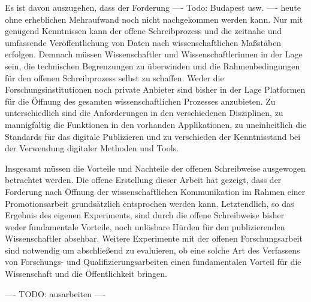 Es ist davon auszugehen, dass der Forderung ---- Todo: Budapest usw. ---- heute ohne erheblichen Mehraufwand noch nicht nachgekommen werden kann. Nur mit genügend Kenntnissen kann der offene Schreibprozess und die zeitnahe und umfassende Veröffentlichung von Daten nach wissenschaftlichen Maßstäben erfolgen. Demnach müssen Wissenschaftler und Wissenschaftlerinnen in der Lage sein, die technischen Begrenzungen zu überwinden und die Rahmenbedingungen für den offenen Schreibprozess selbst zu schaffen. Weder die Forschungsinstitutionen noch private Anbieter sind bisher in der Lage Platformen für die Öffnung des gesamten wissenschaftlichen Prozesses anzubieten. Zu unterschiedlich sind die Anforderungen in den verschiedenen Disziplinen, zu mannigfaltig die Funktionen in den vorhanden Applikationen, zu uneinheitlich die Standards für das digitale Publizieren und zu verschieden der Kenntnisstand bei der Verwendung digitaler Methoden und Tools.

Insgesamt müssen die Vorteile und Nachteile der offenen Schreibweise ausgewogen betrachtet werden. Die offene Erstellung dieser Arbeit hat gezeigt, dass der Forderung nach Öffnung der wissenschaftlichen Kommunikation im Rahmen einer Promotionsarbeit grundsätzlich entsprochen werden kann. Letztendlich, so das Ergebnis des eigenen Experiments, sind durch die offene Schreibweise bisher weder fundamentale Vorteile, noch unlösbare Hürden für den publizierenden Wissenschaftler absehbar. Weitere Experimente mit der offenen Forschungsarbeit sind notwendig um abschließend zu evaluieren, ob eine solche Art des Verfassens von Forschungs- und Qualifizierungsarbeiten einen fundamentalen Vorteil für die Wissenschaft und die Öffentlichkeit bringen.

---- TODO: ausarbeiten ----
